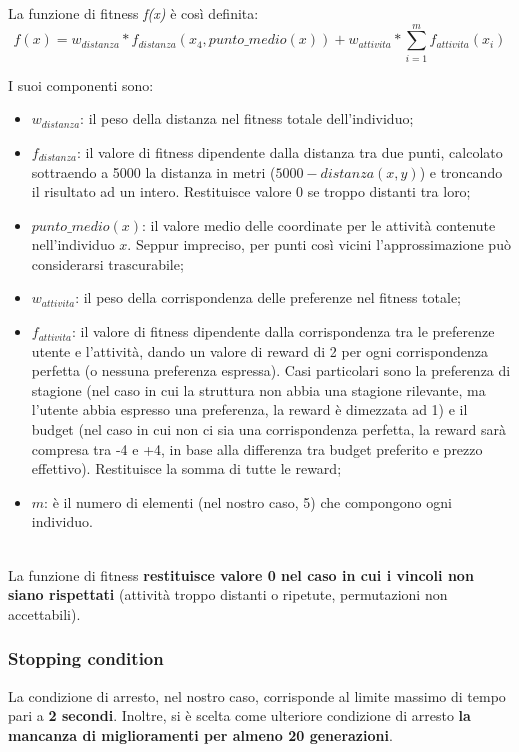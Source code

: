\documentclass{CSUniSchoolLabReport}
\begin{document}
La funzione di fitness \textit{f(x)} è così definita: \\

$$f(x) = w_{distanza} * f_{distanza}(x_4, punto\_medio(x)) + w_{attivita} * \sum_{i=1}^{m} f_{attivita}(x_i)$$

I suoi componenti sono:
\begin{itemize}
    \item $w_{distanza}$: il peso della distanza nel fitness totale dell'individuo;
    \item $f_{distanza}$: il valore di fitness dipendente dalla distanza tra due punti, calcolato sottraendo a 5000 la distanza in metri ($5000 - distanza(x, y)$) e troncando il risultato ad un intero. Restituisce valore 0 se troppo distanti tra loro;
    \item $punto\_medio(x)$: il valore medio delle coordinate per le attività contenute nell'individuo $x$. Seppur impreciso, per punti così vicini l'approssimazione può considerarsi trascurabile;
    \item $w_{attivita}$: il peso della corrispondenza delle preferenze nel fitness totale;
    \item $f_{attivita}$: il valore di fitness dipendente dalla corrispondenza tra le preferenze utente e l'attività, dando un valore di reward di 2 per ogni corrispondenza perfetta (o nessuna preferenza espressa). Casi particolari sono la preferenza di stagione (nel caso in cui la struttura non abbia una stagione rilevante, ma l'utente abbia espresso una preferenza, la reward è dimezzata ad 1) e il budget (nel caso in cui non ci sia una corrispondenza perfetta, la reward sarà compresa tra -4 e +4, in base alla differenza tra budget preferito e prezzo effettivo). Restituisce la somma di tutte le reward;
    \item $m$: è il numero di elementi (nel nostro caso, 5) che compongono ogni individuo.
\end{itemize}
~\\
La funzione di fitness \textbf{restituisce valore 0 nel caso in cui i vincoli non siano rispettati} (attività troppo distanti o ripetute, permutazioni non accettabili).


\subsubsection{Stopping condition}

La condizione di arresto, nel nostro caso, corrisponde al limite massimo di tempo pari a \textbf{2 secondi}.
Inoltre, si è scelta come ulteriore condizione di arresto \textbf{la mancanza di miglioramenti per almeno 20 generazioni}.
\end{document}

